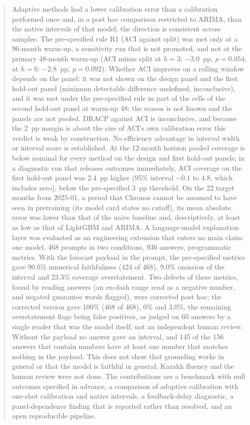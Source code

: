\begin{abstract}
Adaptive methods had a lower calibration error than a calibration performed once and, in a post hoc comparison restricted to ARIMA, than the native intervals of that model; the direction is consistent across samples. The pre-specified rule R1 (ACI against split) was met only at a 96-month warm-up, a sensitivity run that is not promoted, and not at the primary 48-month warm-up (ACI minus split at $h=3$: $-3.0$~pp, $p=0.054$; at $h=6$: $-2.8$~pp, $p=0.092$). Whether ACI improves on a rolling window depends on the panel: it was not shown on the design panel and the first hold-out panel (minimum detectable difference undefined, inconclusive), and it was met under the pre-specified rule in part of the cells of the second hold-out panel at warm-up 48; the reason is not known and the panels are not pooled. DRACP against ACI is inconclusive, and because the 2~pp margin is about the size of ACI's own calibration error this verdict is weak by construction. No efficiency advantage in interval width or interval score is established. At the 12-month horizon pooled coverage is below nominal for every method on the design and first hold-out panels; in a diagnostic run that releases outcomes immediately, ACI coverage on the first hold-out panel was 2.4~pp higher (95\% interval $-0.1$ to $4.8$, which includes zero), below the pre-specified 3~pp threshold. On the 22 target months from 2025-01, a period that Chronos cannot be assumed to have seen in pretraining (its model card states no cutoff), its mean absolute error was lower than that of the naive baseline and, descriptively, at least as low as that of LightGBM and ARIMA. A language-model explanation layer was evaluated as an engineering extension that enters no main claim: one model, 468 prompts in two conditions, 936 answers, programmatic metrics. With the forecast payload in the prompt, the pre-specified metrics gave 90.6\% numerical faithfulness (424 of 468), 9.0\% omission of the interval and 23.3\% coverage overstatement. Two defects of these metrics, found by reading answers (an en-dash range read as a negative number, and negated guarantee words flagged), were corrected post hoc; the corrected version gave 100\% (468 of 468), 0\% and 3.0\%, the remaining overstatement flags being false positives, as judged on 60 answers by a single reader that was the model itself, not an independent human review. Without the payload no answer gave an interval, and 145 of the 156 answers that contain numbers have at least one number that matches nothing in the payload. This does not show that grounding works in general or that the model is faithful in general; Kazakh fluency and the human review were not done. The contributions are a benchmark with null outcomes specified in advance, a comparison of adaptive calibration with one-shot calibration and native intervals, a feedback-delay diagnostic, a panel-dependence finding that is reported rather than resolved, and an open reproducible pipeline.
\end{abstract}
